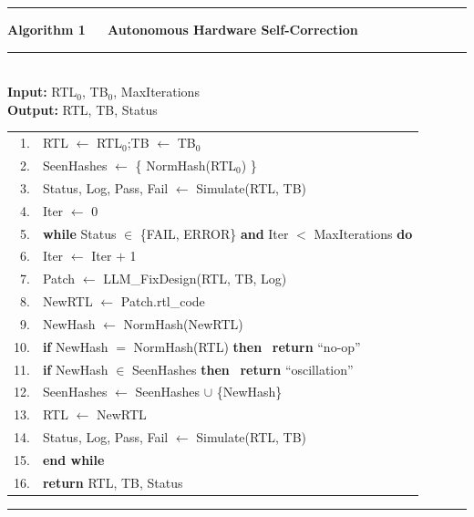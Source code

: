 \documentclass[11pt,a4paper]{article}
\newenvironment{algobox}
  {\par\smallskip\noindent\rule{\linewidth}{0.8pt}\par\vspace{2pt}\small}
  {\par\vspace{2pt}\noindent\rule{\linewidth}{0.8pt}\par\smallskip}
\begin{document}
\begin{algobox}
{\normalsize\bfseries\rmfamily Algorithm 1\ \ \ Autonomous Hardware Self-Correction}\\[2pt]
{\rmfamily\rule{\linewidth}{0.4pt}}\\[2pt]
{\rmfamily\textbf{Input:} RTL$_0$, TB$_0$, MaxIterations\\
\textbf{Output:} RTL, TB, Status}\\[3pt]
{\rmfamily
\begin{tabularx}{\linewidth}{@{}r@{\hspace{0.75em}}>{\raggedright\arraybackslash}X@{}}
1.  & RTL $\gets$ RTL$_0$;\quad TB $\gets$ TB$_0$ \\
2.  & SeenHashes $\gets$ \{ NormHash(RTL$_0$) \} \\
3.  & Status, Log, Pass, Fail $\gets$ Simulate(RTL, TB) \\
4.  & Iter $\gets$ 0 \\
5.  & \textbf{while} Status $\in$ \{FAIL, ERROR\} \textbf{and} Iter $<$ MaxIterations \textbf{do} \\
6.  & \hspace*{1.2em} Iter $\gets$ Iter $+$ 1 \\
7.  & \hspace*{1.2em} Patch $\gets$ LLM\_FixDesign(RTL, TB, Log) \\
8.  & \hspace*{1.2em} NewRTL $\gets$ Patch.rtl\_code \\
9.  & \hspace*{1.2em} NewHash $\gets$ NormHash(NewRTL) \\
10. & \hspace*{1.2em} \textbf{if} NewHash $=$ NormHash(RTL) \textbf{then} \ \textbf{return} ``no-op'' \\
11. & \hspace*{1.2em} \textbf{if} NewHash $\in$ SeenHashes \textbf{then} \ \textbf{return} ``oscillation'' \\
12. & \hspace*{1.2em} SeenHashes $\gets$ SeenHashes $\cup$ \{NewHash\} \\
13. & \hspace*{1.2em} RTL $\gets$ NewRTL \\
14. & \hspace*{1.2em} Status, Log, Pass, Fail $\gets$ Simulate(RTL, TB) \\
15. & \textbf{end while} \\
16. & \textbf{return} RTL, TB, Status \\
\end{tabularx}}
\end{algobox}
\end{document}

